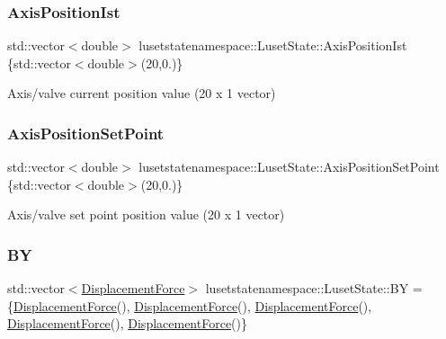 \subsubsection{\texorpdfstring{Axis\+Position\+Ist}{AxisPositionIst}}
{\footnotesize\ttfamily std\+::vector$<$double$>$ lusetstatenamespace\+::\+Luset\+State\+::\+Axis\+Position\+Ist \{std\+::vector$<$double$>$(20,0.)\}}



Axis/valve current position value (20 x 1 vector) 

\mbox{\label{classlusetstatenamespace_1_1LusetState_a56c2fd580cf37edb27331fd0f2c2c568}} 
\subsubsection{\texorpdfstring{Axis\+Position\+Set\+Point}{AxisPositionSetPoint}}
{\footnotesize\ttfamily std\+::vector$<$double$>$ lusetstatenamespace\+::\+Luset\+State\+::\+Axis\+Position\+Set\+Point \{std\+::vector$<$double$>$(20,0.)\}}



Axis/valve set point position value (20 x 1 vector) 

\mbox{\label{classlusetstatenamespace_1_1LusetState_abeb4a528a04de04fb13a5012d23fb9fd}} 
\subsubsection{\texorpdfstring{BY}{BY}}
{\footnotesize\ttfamily std\+::vector$<$\hyperlink{structlusetstatenamespace_1_1LusetState_1_1DisplacementForce}{Displacement\+Force}$>$ lusetstatenamespace\+::\+Luset\+State\+::\+BY = \{\hyperlink{structlusetstatenamespace_1_1LusetState_1_1DisplacementForce}{Displacement\+Force}(), \hyperlink{structlusetstatenamespace_1_1LusetState_1_1DisplacementForce}{Displacement\+Force}(), \hyperlink{structlusetstatenamespace_1_1LusetState_1_1DisplacementForce}{Displacement\+Force}(), \hyperlink{structlusetstatenamespace_1_1LusetState_1_1DisplacementForce}{Displacement\+Force}(), \hyperlink{structlusetstatenamespace_1_1LusetState_1_1DisplacementForce}{Displacement\+Force}()\}}



